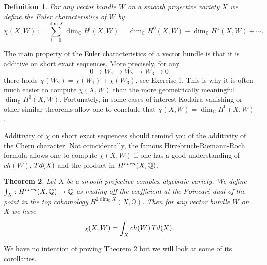 \documentclass[11pt]{article}
\numberwithin{equation}{section}
\numberwithin{footnote}{section}
\newtheorem{thm}{Theorem}[section]
\newtheorem{defn}[thm]{Definition}
\newcommand{\blue}{\color{blue}}
\newcommand{\Q}{{\mathbb Q}}
\newcommand{\C}{{\mathbb C}}
\begin{document}
\smallskip
\begin{defn}
For any vector bundle $W$ on a smooth projective variety $X$ we define the {\blue Euler characteristics} of $W$ by
$$
\chi(X,W):= \sum_{i=0}^{\dim X} \dim_\C H^i(X,W) = \dim_\C H^0(X,W)- \dim_\C H^1(X,W)+\cdots. 
$$
\end{defn}

The main property of the Euler characteristics of a vector bundle is that it is additive on short exact sequences. More precisely, for any 
$$
0\to W_1 \to W_2\to W_3 \to 0
$$
there holds $\chi(W_2) = \chi(W_1)+\chi(W_3)$,
see Exercise 1.
This is why it is often much easier to compute $\chi(X,W)$ than the more geometrically meaningful $\dim_\C H^0(X,W)$. Fortunately, in some cases of interest Kodaira vanishing or other similar theorems allow one to conclude that 
$\chi(X,W) = \dim_\C H^0(X,W)$. 

\smallskip
Additivity of $\chi$ on short exact sequences should remind you of the additivity of the Chern character. Not coincidentally, the famous {\blue Hirzebruch-Riemann-Roch formula} allows one to compute $\chi(X,W)$ if one has a good understanding of $ch(W)$, ${\rm Td}(X)$ and the product in $H^{\rm even}(X,\Q)$.

\smallskip
\begin{thm}\label{hrr}
Let $X$ be a smooth projective complex algebraic variety.
We define $\int_X:H^{\rm even}(X,\Q)\to \Q$ as reading off the coefficient at the Poincar\'e dual of the point in the top cohomology $H^{2\dim_\C X}(X,\Q)$. Then for any vector bundle $W$ on $X$ we have
$$
\chi(X,W) = \int_X ch(W) \,{\rm Td}(X).
$$
\end{thm}

We have no intention of proving Theorem \ref{hrr} but we will look at some of its corollaries.
\end{document}
